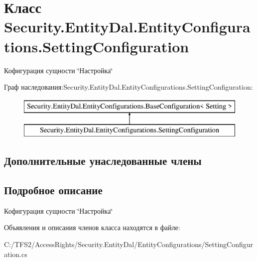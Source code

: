 \hypertarget{class_security_1_1_entity_dal_1_1_entity_configurations_1_1_setting_configuration}{}\section{Класс Security.\+Entity\+Dal.\+Entity\+Configurations.\+Setting\+Configuration}
\label{class_security_1_1_entity_dal_1_1_entity_configurations_1_1_setting_configuration}


Кофигурация сущности \char`\"{}Настройка\char`\"{}  


Граф наследования\+:Security.\+Entity\+Dal.\+Entity\+Configurations.\+Setting\+Configuration\+:\begin{figure}[H]
\begin{center}
\leavevmode
\includegraphics[height=2.000000cm]{d7/d39/class_security_1_1_entity_dal_1_1_entity_configurations_1_1_setting_configuration}
\end{center}
\end{figure}
\subsection*{Дополнительные унаследованные члены}


\subsection{Подробное описание}
Кофигурация сущности \char`\"{}Настройка\char`\"{} 



Объявления и описания членов класса находятся в файле\+:\begin{DoxyCompactItemize}
\item 
C\+:/\+T\+F\+S2/\+Access\+Rights/\+Security.\+Entity\+Dal/\+Entity\+Configurations/Setting\+Configuration.\+cs\end{DoxyCompactItemize}
